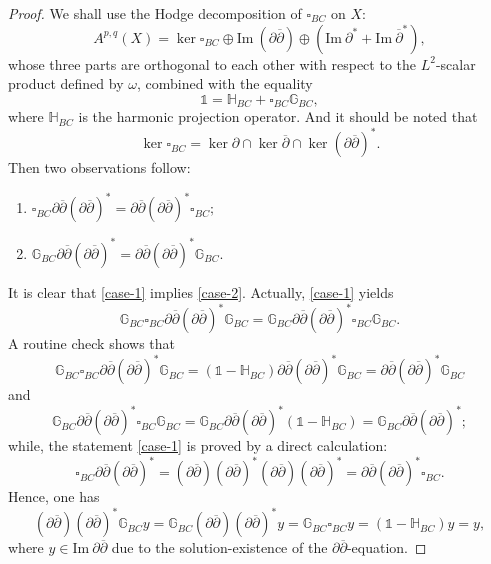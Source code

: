\documentclass[12pt]{amsart}
\numberwithin{equation}{section}
\renewcommand{\1}{\mathds{1}}
\newcommand{\G}{\mathbb{G}}
\newcommand{\db}{\overline{\partial}}
\renewcommand{\>}{\rightarrow}
\newcommand{\p}{\partial}
\def\p{\partial}
\begin{document}
\begin{proof}
We shall use the Hodge decomposition of $\square_{BC}$ on $X$:
\begin{equation}\label{bc-hod}
A^{p,q}(X)=\ker\square_{BC}\oplus \textrm{Im}~(\p\db)
\oplus(\textrm{Im}~\p^*+\textrm{Im}~\db^*),
\end{equation}
whose three parts are orthogonal to each other with respect to the
$L^2$-scalar product defined by $\omega$, combined with the equality
$$\1=\mathbb{H}_{BC}+\square_{BC}\G_{BC},$$
where $\mathbb{H}_{BC}$ is the harmonic projection operator. And it
should be noted that
\begin{equation}\label{bc-ker}
\ker\square_{BC}=\ker\p\cap\ker\db\cap\ker(\p\db)^*.
\end{equation}
Then two observations follow:
\begin{enumerate}[(1)]
    \item \label{case-1}
$\square_{BC}\p\db(\p\db)^*=\p\db(\p\db)^*\square_{BC};$
    \item \label{case-2}
$\G_{BC}\p\db(\p\db)^*=\p\db(\p\db)^*\G_{BC}.$
 \end{enumerate}
It is clear that \eqref{case-1} implies \eqref{case-2}. Actually,
\eqref{case-1} yields
\[ \G_{BC}\square_{BC}\p\db(\p\db)^*\G_{BC}=\G_{BC}\p\db(\p\db)^*\square_{BC}\G_{BC}. \]
A routine check shows that
$$\G_{BC}\square_{BC}\p\db(\p\db)^*\G_{BC}=(\1-\mathbb{H}_{BC})\p\db(\p\db)^*\G_{BC}=\p\db(\p\db)^*\G_{BC}$$
and
$$\G_{BC}\p\db(\p\db)^*\square_{BC}\G_{BC}=\G_{BC}\p\db(\p\db)^*(\1-\mathbb{H}_{BC})=\G_{BC}\p\db(\p\db)^*;$$
while, the statement \eqref{case-1} is proved by a direct
calculation:
$$\square_{BC}\p\db(\p\db)^*=(\p\db)(\p\db)^*(\p\db)(\p\db)^*=\p\db(\p\db)^*\square_{BC}.$$
Hence, one has
$$(\p\db)(\p\db)^*\G_{BC}y=\G_{BC}(\p\db)(\p\db)^*y=\G_{BC}\square_{BC}y=(\1-\mathbb{H}_{BC})y=y,$$
where $y \in \textrm{Im}~\p \db$ due to the solution-existence of
the $\p\db$-equation.


\end{proof}
\end{document}
